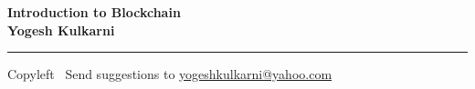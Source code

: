 
\graphicspath{{images/}}

\footnotesize


\begin{center}
\Large{\textbf{Introduction to Blockchain\\ Yogesh Kulkarni}}  
\end{center}

\begin{multicols}{2}

\end{multicols}

\rule{\linewidth}{0.25pt}
\scriptsize
Copyleft \textcopyleft\  Send suggestions to 
\href{http://www.yogeshkulkarni.com}{yogeshkulkarni@yahoo.com}


